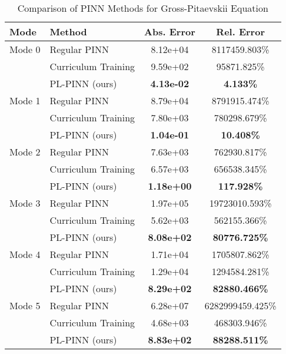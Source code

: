 \begin{table}[htbp]
\centering
\caption{Comparison of PINN Methods for Gross-Pitaevskii Equation}
\label{tab:pinn_comparison}
\begin{tabular}{llcc}
\toprule
Mode & Method & Abs. Error & Rel. Error \\
\midrule
Mode 0 & Regular PINN & 8.12e+04 & 8117459.803\% \\
 & Curriculum Training & 9.59e+02 & 95871.825\% \\
 & PL-PINN (ours) & \textbf{4.13e-02} & \textbf{4.133\%} \\
\midrule
Mode 1 & Regular PINN & 8.79e+04 & 8791915.474\% \\
 & Curriculum Training & 7.80e+03 & 780298.679\% \\
 & PL-PINN (ours) & \textbf{1.04e-01} & \textbf{10.408\%} \\
\midrule
Mode 2 & Regular PINN & 7.63e+03 & 762930.817\% \\
 & Curriculum Training & 6.57e+03 & 656538.345\% \\
 & PL-PINN (ours) & \textbf{1.18e+00} & \textbf{117.928\%} \\
\midrule
Mode 3 & Regular PINN & 1.97e+05 & 19723010.593\% \\
 & Curriculum Training & 5.62e+03 & 562155.366\% \\
 & PL-PINN (ours) & \textbf{8.08e+02} & \textbf{80776.725\%} \\
\midrule
Mode 4 & Regular PINN & 1.71e+04 & 1705807.862\% \\
 & Curriculum Training & 1.29e+04 & 1294584.281\% \\
 & PL-PINN (ours) & \textbf{8.29e+02} & \textbf{82880.466\%} \\
\midrule
Mode 5 & Regular PINN & 6.28e+07 & 6282999459.425\% \\
 & Curriculum Training & 4.68e+03 & 468303.946\% \\
 & PL-PINN (ours) & \textbf{8.83e+02} & \textbf{88288.511\%} \\
\bottomrule
\end{tabular}
\end{table}